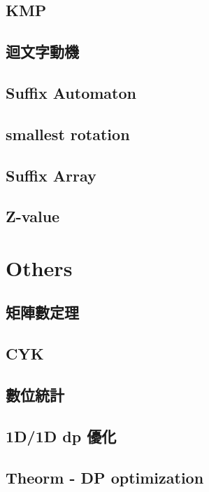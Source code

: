 \subsection{KMP}

\subsection{迴文字動機}

\subsection{Suffix Automaton}

\subsection{smallest rotation}

\subsection{Suffix Array}

\subsection{Z-value}


\section{Others}

\subsection{矩陣數定理}

\subsection{CYK}

\subsection{數位統計}

\subsection{1D/1D dp 優化}

\subsection{Theorm - DP optimization}

